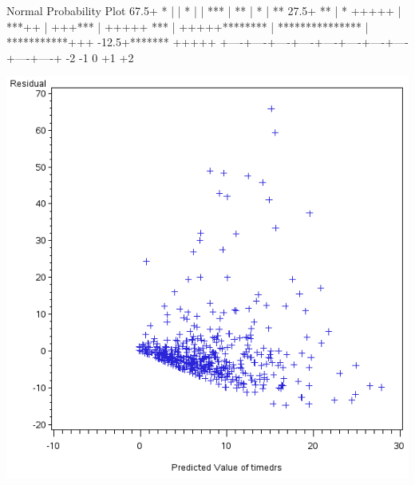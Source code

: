 \documentclass{article}
\begin{document}
\begin{Woutput}
                       Normal Probability Plot
    67.5+                                                  *
        |
        |                                                  *
        |
        |                                                ***
        |                                              **
        |                                             *
        |                                            **
    27.5+                                           **
        |                                           *  +++++
        |                                         ***++
        |                                    +++***
        |                               +++++ ***
        |                         +++++********
        |                ***************
        |      ***********+++
   -12.5+*******   +++++
         +----+----+----+----+----+----+----+----+----+----+
             -2        -1         0        +1        +2
\end{Woutput}
\includegraphics[]{regressx1-1-SAS-fig.png}
\end{document}
